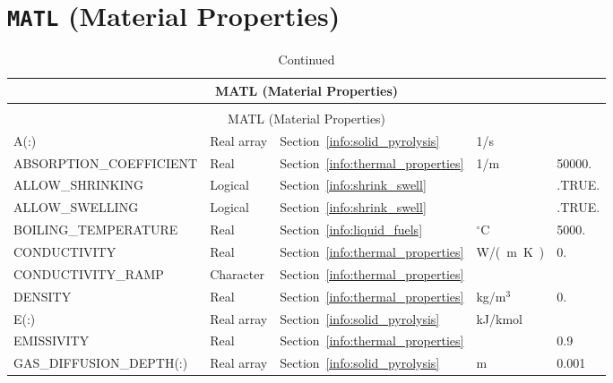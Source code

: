\documentclass[11pt]{book}
\begin{document}
\section{\texorpdfstring{{\tt MATL}}{MATL} (Material Properties)}


\begin{longtable}{@{\extracolsep{\fill}}|l|l|l|l|l|}
\caption[Material properties ({\ct MATL} namelist group)]{For more information see Section~\ref{info:MATL}.}
\label{tbl:MATL} \\
\hline
\multicolumn{5}{|c|}{{\ct MATL} (Material Properties)} \\
\hline \hline
\endfirsthead
\caption[]{Continued} \\
\hline
\multicolumn{5}{|c|}{{\ct MATL} (Material Properties)} \\
\hline \hline
\endhead
{\ct A(:)}                          & Real array    & Section~\ref{info:solid_pyrolysis}    &    1/s            &        \\ \hline
{\ct ABSORPTION\_COEFFICIENT}       & Real          & Section~\ref{info:thermal_properties} &    1/m            & 50000. \\ \hline
{\ct ALLOW\_SHRINKING}              & Logical       & Section~\ref{info:shrink_swell}       &                   & {\ct.TRUE.} \\ \hline
{\ct ALLOW\_SWELLING}               & Logical       & Section~\ref{info:shrink_swell}       &                   & {\ct.TRUE.} \\ \hline
{\ct BOILING\_TEMPERATURE}          & Real          & Section~\ref{info:liquid_fuels}       & $^\circ$C         & 5000.  \\ \hline
{\ct CONDUCTIVITY}                  & Real          & Section~\ref{info:thermal_properties} & \si{W/(m.K)}      & 0.     \\ \hline
{\ct CONDUCTIVITY\_RAMP}            & Character     & Section~\ref{info:thermal_properties} &                   &        \\ \hline
{\ct DENSITY}                       & Real          & Section~\ref{info:thermal_properties} & kg/m$^3$          & 0.     \\ \hline
{\ct E(:)}                          & Real array    & Section~\ref{info:solid_pyrolysis}    & kJ/kmol           &        \\ \hline
{\ct EMISSIVITY    }                & Real          & Section~\ref{info:thermal_properties} &                   & 0.9    \\ \hline
{\ct GAS\_DIFFUSION\_DEPTH(:) }     & Real array    & Section~\ref{info:solid_pyrolysis}    & m                 & 0.001  \\ \hline

\end{longtable}
\end{document}
